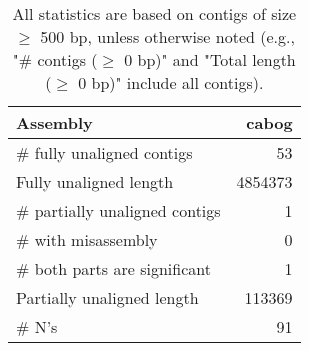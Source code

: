 \documentclass[12pt,a4paper]{article}
\begin{document}
\begin{table}[ht]
\begin{center}
\caption{All statistics are based on contigs of size $\geq$ 500 bp, unless otherwise noted (e.g., "\# contigs ($\geq$ 0 bp)" and "Total length ($\geq$ 0 bp)" include all contigs).}
\begin{tabular}{|l*{1}{|r}|}
\hline
Assembly & cabog \\ \hline
\# fully unaligned contigs & 53 \\ \hline
Fully unaligned length & 4854373 \\ \hline
\# partially unaligned contigs & 1 \\ \hline
\hspace{5mm}\# with misassembly & 0 \\ \hline
\hspace{5mm}\# both parts are significant & 1 \\ \hline
Partially unaligned length & 113369 \\ \hline
\# N's & 91 \\ \hline
\end{tabular}
\end{center}
\end{table}
\end{document}
